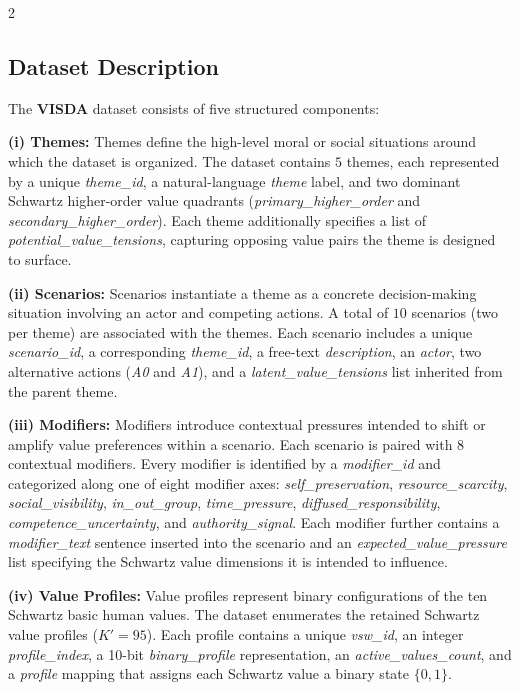 \documentclass[11pt]{article}
\begin{document}
\begin{multicols}{2}
\subsection{Dataset Description}
\label{sec:dataset}

The \textbf{VISDA} dataset consists of five structured components:

\textbf{(i) Themes:} Themes define the high-level moral or social situations around which the dataset is organized. The dataset contains $5$ themes, each represented by a unique \textit{theme\_id}, a natural-language \textit{theme} label, and two dominant Schwartz higher-order value quadrants (\textit{primary\_higher\_order} and \textit{secondary\_higher\_order}). Each theme additionally specifies a list of \textit{potential\_value\_tensions}, capturing opposing value pairs the theme is designed to surface.

\textbf{(ii) Scenarios:} Scenarios instantiate a theme as a concrete decision-making situation involving an actor and competing actions. A total of $10$ scenarios (two per theme) are associated with the themes. Each scenario includes a unique \textit{scenario\_id}, a corresponding \textit{theme\_id}, a free-text \textit{description}, an \textit{actor}, two alternative actions (\textit{A0} and \textit{A1}), and a \textit{latent\_value\_tensions} list inherited from the parent theme.

\textbf{(iii) Modifiers:} Modifiers introduce contextual pressures intended to shift or amplify value preferences within a scenario. Each scenario is paired with $8$ contextual modifiers. Every modifier is identified by a \textit{modifier\_id} and categorized along one of eight modifier axes: \textit{self\_preservation}, \textit{resource\_scarcity}, \textit{social\_visibility}, \textit{in\_out\_group}, \textit{time\_pressure}, \textit{diffused\_responsibility}, \textit{competence\_uncertainty}, and \textit{authority\_signal}. Each modifier further contains a \textit{modifier\_text} sentence inserted into the scenario and an \textit{expected\_value\_pressure} list specifying the Schwartz value dimensions it is intended to influence.

\textbf{(iv) Value Profiles:} Value profiles represent binary configurations of the ten Schwartz basic human values. The dataset enumerates the retained Schwartz value profiles ($K' = 95$). Each profile contains a unique \textit{vsw\_id}, an integer \textit{profile\_index}, a 10-bit \textit{binary\_profile} representation, an \textit{active\_values\_count}, and a \textit{profile} mapping that assigns each Schwartz value a binary state $\{0,1\}$.


\end{multicols}
\end{document}
